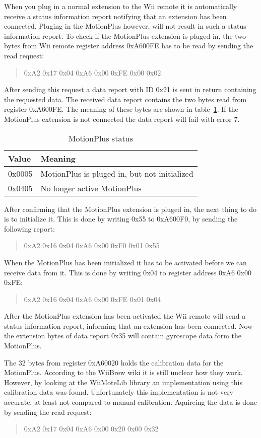 When you plug in a normal extension to the Wii remote it is automatically receive a status information report notifying that an extension has been connected. Pluging in the MotionPlus however, will not result in such a status information report. To check if the MotionPlus extension is pluged in, the two bytes from Wii remote register address 0xA600FE has to be read by sending the read request:
\begin{quote}
0xA2 0x17 0x04 0xA6 0x00 0xFE 0x00 0x02
\end{quote}
After sending this request a data report with ID 0x21 is sent in return containing the requested data. The received data report contains the two bytes read from register 0xA600FE. The meaning of these bytes are shown in table~\ref{tab:motionPlusStatus}. If the MotionPlus extension is not connected the data report will fail with error 7.
\begin{table}[h!]
\begin{tabularx}{\textwidth}{|l|X|}
\hline
Value  & Meaning \\ \hline
0x0005 & MotionPlus is pluged in, but not initialized \\ \hline
0x0405 & No longer active MotionPlus\\ 
\hline
\end{tabularx}
\caption{\footnotesize MotionPlus status}
\label{tab:motionPlusStatus}
\end{table}

After confirming that the MotionPlus extension is pluged in, the next thing to do is to initialize it. This is done by writing 0x55 to 0xA600F0, by sending the following report:
\begin{quote}
0xA2 0x16 0x04 0xA6 0x00 0xF0 0x01 0x55
\end{quote}

When the MotionPlus has been initialized it has to be activated before we can receive data from it. This is done by writing 0x04 to register address 0xA6 0x00 0xFE:
\begin{quote}
0xA2 0x16 0x04 0xA6 0x00 0xFE 0x01 0x04
\end{quote}
After the MotionPlus extension has been activated the Wii remote will send a status information report, informing that an extension has been connected. Now the extension bytes of data report 0x35 will contain gyroscope data form the MotionPlus.

The 32 bytes from register 0xA60020 holds the calibration data for the MotionPlus. According to the WiiBrew wiki \cite{wiiBrew} it is still unclear how they work. However, by looking at the WiiMoteLib \cite{wiiMoteLib} library an implementation using this calibration data was found. Unfortunately this implementation is not very accurate, at least not compared to manual calibration. Aquireing the data is done by sending the read request:
\begin{quote}
0xA2 0x17 0x04 0xA6 0x00 0x20 0x00 0x32
\end{quote}

